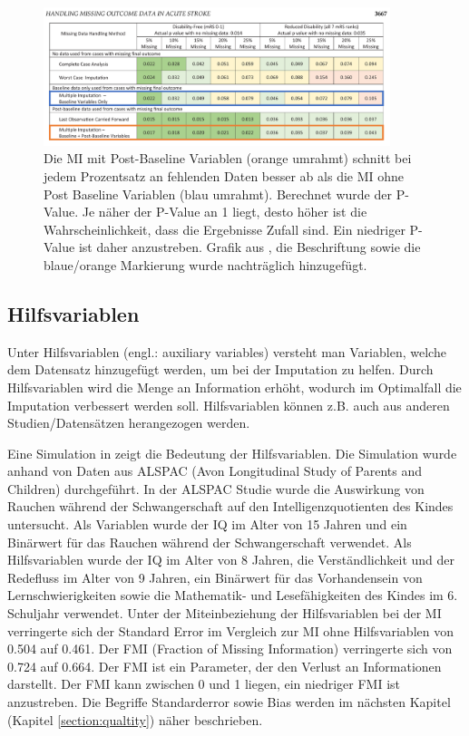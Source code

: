   \begin{figure}[t]
	\centering
	\includegraphics[width=0.9\textwidth]{images/grafik_saver.png}
	\caption{
		Die MI mit Post-Baseline Variablen (orange umrahmt) schnitt bei jedem Prozentsatz an fehlenden Daten besser ab als 
		die MI ohne Post Baseline Variablen (blau umrahmt). Berechnet wurde der P-Value. Je näher der P-Value an 1 liegt, 
		desto höher ist die Wahrscheinlichkeit, dass die Ergebnisse Zufall sind. Ein niedriger P-Value ist daher anzustreben. 
		Grafik aus \textcite[3667]{Young-Saver2018}, die Beschriftung sowie die blaue/orange Markierung wurde nachträglich 
		hinzugefügt.
	}
	\label{figure:study}
\end{figure}

\subsection{Hilfsvariablen}

Unter Hilfsvariablen (engl.: auxiliary variables) versteht man Variablen, welche dem Datensatz hinzugefügt werden, um bei der Imputation zu helfen. \autocite[211]{Graham2007}
Durch Hilfsvariablen wird die Menge an Information erhöht, wodurch im Optimalfall die Imputation verbessert werden soll.
Hilfsvariablen können z.B. auch aus anderen Studien/Datensätzen herangezogen werden.

Eine Simulation in \textcite[]{Madley-Dowd2019} zeigt die Bedeutung der Hilfsvariablen. 
Die Simulation wurde anhand von Daten aus ALSPAC (Avon Longitudinal Study of Parents and Children) 
durchgeführt. In der ALSPAC Studie wurde die Auswirkung von Rauchen während der Schwangerschaft auf den Intelligenzquotienten des Kindes untersucht. Als Variablen wurde
der IQ im Alter von 15 Jahren und ein Binärwert für das Rauchen während der Schwangerschaft verwendet. Als Hilfsvariablen wurde der IQ im Alter von 8 Jahren, die Verständlichkeit 
und der Redefluss im Alter von 9 Jahren, ein Binärwert für das Vorhandensein von Lernschwierigkeiten sowie die Mathematik- und Lesefähigkeiten des Kindes im 6. Schuljahr verwendet. 
Unter der Miteinbeziehung der Hilfsvariablen bei der MI verringerte sich der Standard Error im Vergleich zur MI ohne Hilfsvariablen von 0.504 auf 0.461. Der FMI (Fraction of Missing Information)
verringerte sich von 0.724 auf 0.664. \autocite[71]{Madley-Dowd2019} Der FMI ist ein Parameter, der den Verlust an Informationen darstellt. Der FMI kann zwischen 0 und 1 liegen, 
ein niedriger FMI ist anzustreben.
\autocite[65]{Madley-Dowd2019} Die Begriffe Standarderror sowie Bias werden im nächsten Kapitel (Kapitel \ref{section:qualtity}) näher beschrieben. 


